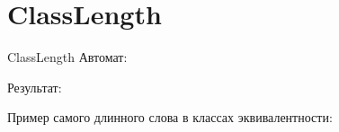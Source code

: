 \section{ClassLength}
\begin{frame}{ClassLength}
	Автомат:


	Результат:

	Пример самого длинного слова в классах эквивалентности:


\end{frame}

